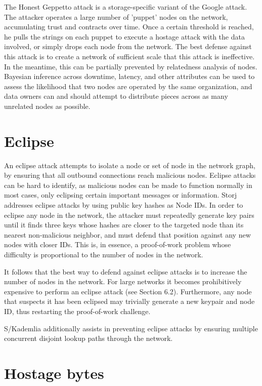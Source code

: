 \documentclass[11pt,fleqn,openany]{book}
\begin{document}
The Honest Geppetto attack is a storage-specific variant of the Google attack.
The attacker operates a large number of 'puppet' nodes on the network,
accumulating trust and contracts over time. Once a certain threshold is reached,
he pulls the strings on each puppet to execute a hostage attack with the data
involved, or simply drops each node from the network. The best defense
against this attack is to create a network of sufficient scale that this attack
is ineffective. In the meantime, this can be partially prevented by relatedness
analysis of nodes. Bayesian inference across downtime, latency, and other
attributes can be used to assess the likelihood that two nodes are operated by
the same organization, and data owners can and should attempt to distribute
pieces across as many unrelated nodes as possible.

\section{Eclipse}

An eclipse attack attempts to isolate a node or set of node in the network
graph, by ensuring that all outbound connections reach malicious nodes. Eclipse
attacks can be hard to identify, as malicious nodes can be made to function
normally in most cases, only eclipsing certain important messages or
information. Storj addresses eclipse attacks by using public key hashes as Node
IDs. In order to eclipse any node in the network, the attacker must repeatedly
generate key pairs until it finds three keys whose hashes are closer to the
targeted node than its nearest non-malicious neighbor, and must defend that
position against any new nodes with closer IDs. This is, in essence, a
proof-of-work problem whose difficulty is proportional to the number of nodes in
the network.

It follows that the best way to defend against eclipse attacks is to increase
the number of nodes in the network. For large networks it becomes prohibitively
expensive to perform an eclipse attack (see Section 6.2). Furthermore, any node
that suspects it has been eclipsed may trivially generate a new keypair and node
ID, thus restarting the proof-of-work challenge.

S/Kademlia additionally assists in preventing eclipse attacks by ensuring
multiple concurrent disjoint lookup paths through the network.

\section{Hostage bytes}
\end{document}
